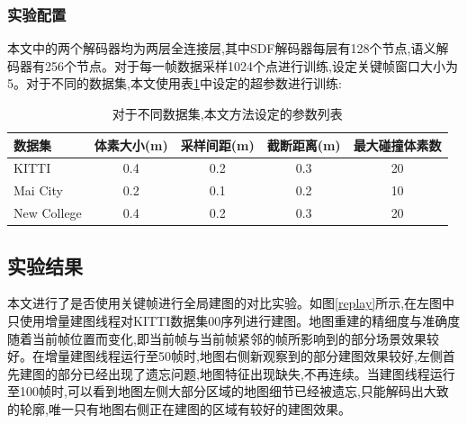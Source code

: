 \subsubsection{实验配置}
本文中的两个解码器均为两层全连接层,其中SDF解码器每层有128个节点,语义解码器有256个节点。对于每一帧数据采样1024个点进行训练,设定关键帧窗口大小为5。对于不同的数据集,本文使用表\ref{parameters}中设定的超参数进行训练:
\begin{table}[htbp]
    \centering
    \caption{对于不同数据集,本文方法设定的参数列表}\label{parameters}
    \begin{tabular}[htbp]{llcccc}
        \toprule
        \multicolumn{2}{l}{数据集} & 体素大小(m) & 采样间距(m) & 截断距离(m) &最大碰撞体素数 \\
        \midrule
        \multicolumn{2}{l}{KITTI} & 0.4 & 0.2 &0.3 &20\\
        \multicolumn{2}{l}{Mai City} & 0.2 &0.1&0.2&10\\
        \multicolumn{2}{l}{New College} & 0.4 &0.2&0.3&20\\
        \bottomrule
    \end{tabular}
\end{table}
\subsection{实验结果}
本文进行了是否使用关键帧进行全局建图的对比实验。如图\ref{replay}所示,在左图中只使用增量建图线程对KITTI数据集00序列进行建图。地图重建的精细度与准确度随着当前帧位置而变化,即当前帧与当前帧紧邻的帧所影响到的部分场景效果较好。在增量建图线程运行至50帧时,地图右侧新观察到的部分建图效果较好,左侧首先建图的部分已经出现了遗忘问题,地图特征出现缺失,不再连续。当建图线程运行至100帧时,可以看到地图左侧大部分区域的地图细节已经被遗忘,只能解码出大致的轮廓,唯一只有地图右侧正在建图的区域有较好的建图效果。

